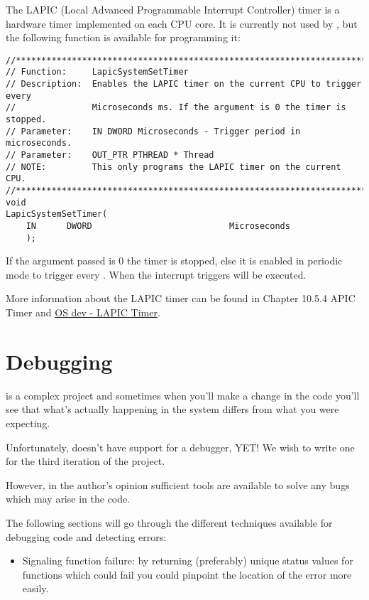 \begin{appendices}
The LAPIC (Local Advanced Programmable Interrupt Controller) timer is a hardware timer implemented on each CPU core.
It is currently not used by \projectname, but the following function is available for programming it:
\begin{lstlisting}[caption={LAPIC Timer},label={lst:LapicTimer}]
//******************************************************************************
// Function:     LapicSystemSetTimer
// Description:  Enables the LAPIC timer on the current CPU to trigger every
//               Microseconds ms. If the argument is 0 the timer is stopped.
// Parameter:    IN DWORD Microseconds - Trigger period in microseconds.
// Parameter:    OUT_PTR PTHREAD * Thread
// NOTE:         This only programs the LAPIC timer on the current CPU.
//******************************************************************************
void
LapicSystemSetTimer(
    IN      DWORD                           Microseconds
    );
\end{lstlisting}

If the argument passed is 0 the timer is stopped, else it is enabled in periodic mode to trigger every .
When the interrupt triggers  will be executed.

More information about the LAPIC timer can be found in \cite{intelSys} Chapter 10.5.4 APIC Timer and
\href{http://wiki.osdev.org/APIC_timer}{OS dev - LAPIC Timer}.

\chapter{Debugging}
\label{chap:Debugging}

\projectname is a complex project and sometimes when you'll make a change in the code you'll see
that what's actually happening in the system differs from what you were expecting.

Unfortunately, \projectname doesn't have support for a debugger, YET! We wish to write one for the
third iteration of the project.

However, in the author's opinion sufficient tools are available to solve any bugs which may arise
in the code.

The following sections will go through the different techniques available for debugging code and
detecting errors:
\begin{itemize}
	\item Signaling function failure: by returning (preferably) unique status values for functions which could fail you could pinpoint the location of the error more easily.


\end{itemize}
\end{appendices}
